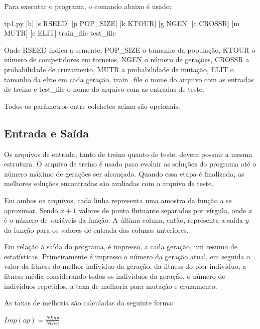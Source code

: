 \documentclass[12pt]{article}
\begin{document}
Para executar o programa, o comando abaixo é usado:

\begin{center}
 tp1.py [\-h] [\-s RSEED] [\-p POP\_SIZE] [\-k KTOUR] [\-g NGEN] [\-c CROSSR]
              [\-m MUTR] [\-e ELIT]
              train\_file test\_file
\end{center}

Onde RSEED indica a semente, POP\_SIZE o tamanho da população, KTOUR o número de competidores
em torneios, NGEN o número de gerações, CROSSR a probabilidade de cruzamento, MUTR a probabilidade
de mutação, ELIT o tamanho da elite em cada geração, train\_file o nome do arquivo com as
entradas de treino e test\_file o nome do arquivo com as entradas de teste.

Todos os parâmetros entre colchetes acima são opcionais.

\subsection{Entrada e Saída}

Os arquivos de entrada, tanto de treino quanto de teste, devem possuir a mesma estrutura.
O arquivo de treino é usado para evoluir as soluções do programa até o número máximo de
gerações ser alcançado. Quando essa etapa é finalizada, as melhores soluções encontradas
são avaliadas com o arquivo de teste.

Em ambos os arquivos, cada linha representa uma amostra da função a se aproximar. Sendo
$ x + 1 $ valores de ponto flutuante separados por vírgula, onde $ x $ é o número de variáveis
da função. A última coluna, então, representa a saída $ y $ da função para os valores de entrada
das colunas anteriores.

Em relação à saída do programa, é impresso, a cada geração, um resumo de estatísticas.
Primeiramente é impresso o número da geração atual, em seguida o valor da fitness do melhor
indivíduo da geração, da fitness do pior indivíduo, a fitness média considerando todos
os indivíduos da geração, o número de indivíduos repetidos, a taxa de melhoria para mutação
e cruzamento.

As taxas de melhoria são calculadas da seguinte forma:

\begin{center}
 \begin{math}
  Imp(op) = \frac{NImp}{NGen}
 \end{math}
\end{center}
\end{document}
